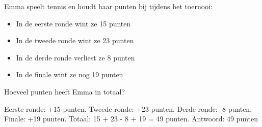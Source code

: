 \begin{opgave}
Emma speelt tennis en houdt haar punten bij tijdens het toernooi:

\begin{itemize}
\item In de eerste ronde wint ze 15 punten
\item In de tweede ronde wint ze 23 punten
\item In de derde ronde verliest ze 8 punten
\item In de finale wint ze nog 19 punten
\end{itemize}

Hoeveel punten heeft Emma in totaal?
\end{opgave}

\begin{oplossing}
Eerste ronde: +15 punten.
Tweede ronde: +23 punten.
Derde ronde: -8 punten.
Finale: +19 punten.
Totaal: 15 + 23 - 8 + 19 = 49 punten.
Antwoord: 49 punten
\end{oplossing}